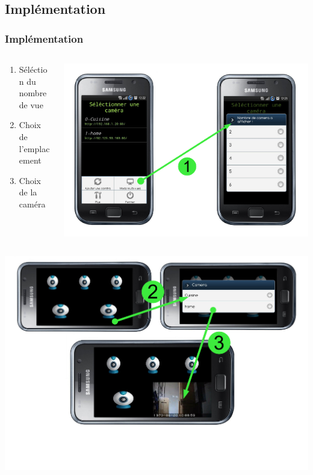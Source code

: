   \subsection{Implémentation}
  \begin{frame}
   \frametitle{Implémentation}



\begin{columns}
\begin{column}{7cm}
\begin{enumerate}
    \item Séléction du nombre de vue
  	\item Choix de l'emplacement
  	\item Choix de la caméra
\end{enumerate}
\end{column}
\begin{column}{7cm}
   \includegraphics[scale=0.15]{Images/slide9-2part1.pdf}
\end{column}
\end{columns}
\begin{center}
   \includegraphics[scale=0.25]{Images/slide9-2part2.pdf}
   \end{center}
  \end{frame}

  